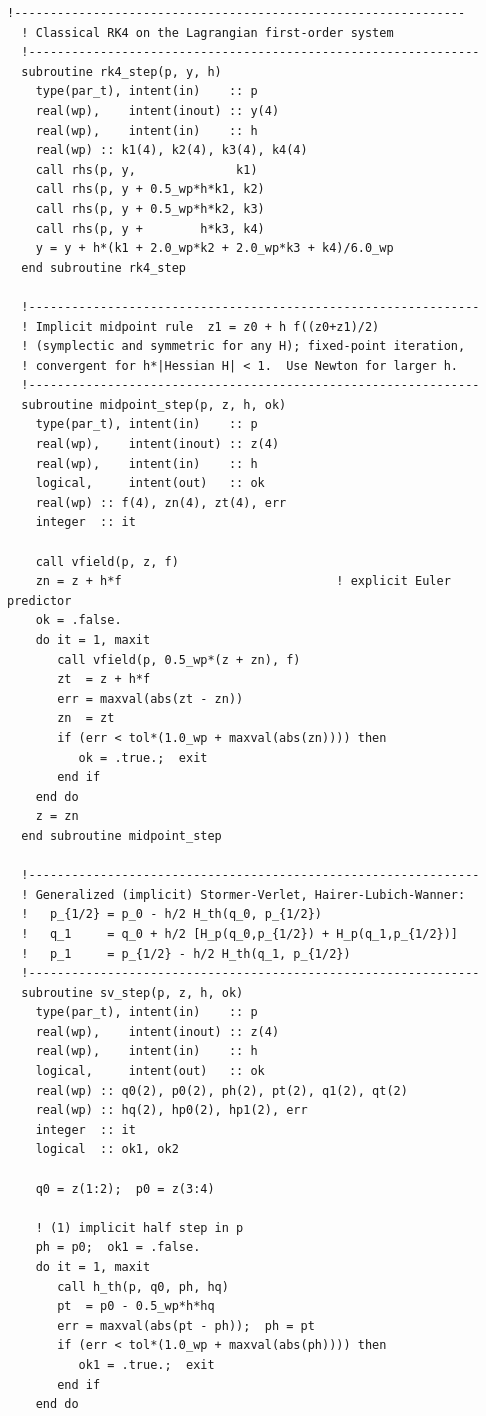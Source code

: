 \documentclass[11pt,a4paper]{book}
\theoremstyle{definition}
\theoremstyle{remark}
\begin{document}
\begin{lstlisting}[language={[95]Fortran},basicstyle=\ttfamily\scriptsize]
  !---------------------------------------------------------------
  ! Classical RK4 on the Lagrangian first-order system
  !---------------------------------------------------------------
  subroutine rk4_step(p, y, h)
    type(par_t), intent(in)    :: p
    real(wp),    intent(inout) :: y(4)
    real(wp),    intent(in)    :: h
    real(wp) :: k1(4), k2(4), k3(4), k4(4)
    call rhs(p, y,              k1)
    call rhs(p, y + 0.5_wp*h*k1, k2)
    call rhs(p, y + 0.5_wp*h*k2, k3)
    call rhs(p, y +        h*k3, k4)
    y = y + h*(k1 + 2.0_wp*k2 + 2.0_wp*k3 + k4)/6.0_wp
  end subroutine rk4_step

  !---------------------------------------------------------------
  ! Implicit midpoint rule  z1 = z0 + h f((z0+z1)/2)
  ! (symplectic and symmetric for any H); fixed-point iteration,
  ! convergent for h*|Hessian H| < 1.  Use Newton for larger h.
  !---------------------------------------------------------------
  subroutine midpoint_step(p, z, h, ok)
    type(par_t), intent(in)    :: p
    real(wp),    intent(inout) :: z(4)
    real(wp),    intent(in)    :: h
    logical,     intent(out)   :: ok
    real(wp) :: f(4), zn(4), zt(4), err
    integer  :: it

    call vfield(p, z, f)
    zn = z + h*f                              ! explicit Euler predictor
    ok = .false.
    do it = 1, maxit
       call vfield(p, 0.5_wp*(z + zn), f)
       zt  = z + h*f
       err = maxval(abs(zt - zn))
       zn  = zt
       if (err < tol*(1.0_wp + maxval(abs(zn)))) then
          ok = .true.;  exit
       end if
    end do
    z = zn
  end subroutine midpoint_step

  !---------------------------------------------------------------
  ! Generalized (implicit) Stormer-Verlet, Hairer-Lubich-Wanner:
  !   p_{1/2} = p_0 - h/2 H_th(q_0, p_{1/2})
  !   q_1     = q_0 + h/2 [H_p(q_0,p_{1/2}) + H_p(q_1,p_{1/2})]
  !   p_1     = p_{1/2} - h/2 H_th(q_1, p_{1/2})
  !---------------------------------------------------------------
  subroutine sv_step(p, z, h, ok)
    type(par_t), intent(in)    :: p
    real(wp),    intent(inout) :: z(4)
    real(wp),    intent(in)    :: h
    logical,     intent(out)   :: ok
    real(wp) :: q0(2), p0(2), ph(2), pt(2), q1(2), qt(2)
    real(wp) :: hq(2), hp0(2), hp1(2), err
    integer  :: it
    logical  :: ok1, ok2

    q0 = z(1:2);  p0 = z(3:4)

    ! (1) implicit half step in p
    ph = p0;  ok1 = .false.
    do it = 1, maxit
       call h_th(p, q0, ph, hq)
       pt  = p0 - 0.5_wp*h*hq
       err = maxval(abs(pt - ph));  ph = pt
       if (err < tol*(1.0_wp + maxval(abs(ph)))) then
          ok1 = .true.;  exit
       end if
    end do


\end{lstlisting}
\end{document}
